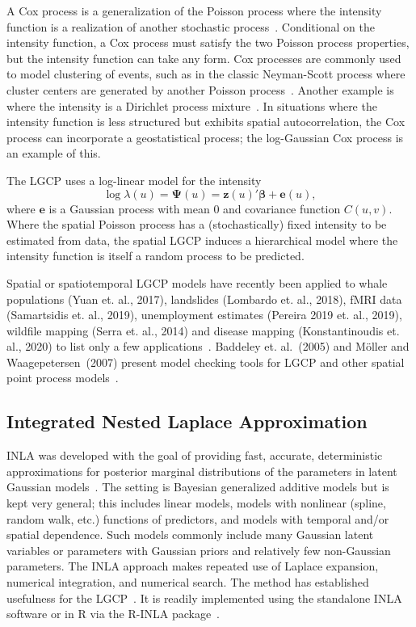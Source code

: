 \documentclass{interact}
\begin{document}
A Cox process is a generalization of the Poisson process where the intensity
function is a realization of another stochastic process~\cite{cox,digglepoint}.
Conditional on the intensity function, a Cox process must satisfy the two
Poisson process properties, but the intensity function can take any form. Cox
processes are commonly used to model clustering of events, such as in the
classic Neyman-Scott process where cluster centers are generated by another
Poisson process~\cite{neymanscott}. Another example is where the intensity is
a Dirichlet process mixture~\cite{taddy,flagg2020}. In situations where the intensity
function is less structured but exhibits spatial autocorrelation, the Cox
process can incorporate a geostatistical process; the log-Gaussian Cox process
is an example of this.

The LGCP uses a log-linear model for the intensity
\begin{equation}
\log\lambda(u) = \boldsymbol{\Psi}(u)
= \mathbf{z}(u)' \boldsymbol{\beta} + \mathbf{e}(u),
\end{equation}
where \(\mathbf{e}\) is a Gaussian process with mean 0 and covariance function
\(C(u, v)\). Where the spatial Poisson process has a (stochastically) 
fixed intensity to be
estimated from data, the spatial LGCP induces a hierarchical model where the
intensity function is itself a random process to be predicted.

Spatial or spatiotemporal LGCP models have recently been applied to whale
populations (Yuan et. al., 2017), landslides (Lombardo et. al., 2018), fMRI
data (Samartsidis et. al., 2019), unemployment estimates (Pereira 2019 et. al., 2019), wildfile mapping (Serra et. al., 2014) and disease mapping (Konstantinoudis et.
al., 2020) to list only a few
applications~\cite{yuanetal,lombardoetal,samartsidisetal,pereira2019,serra2014,konstantinoudisetal}.
Baddeley et. al.~(2005) and M\"{o}ller and Waagepetersen~(2007) present model
checking tools for LGCP and other spatial point process
models~\cite{baddeleyresiduals,moellerwaagepetersen}.


\subsection{Integrated Nested Laplace Approximation}
\label{inla}

INLA was developed with the goal of providing fast, accurate, deterministic
approximations for posterior marginal distributions of the parameters in
latent Gaussian models~\cite{rueetal}. The setting is Bayesian generalized
additive models but is kept very general; this includes linear models, models
with nonlinear (spline, random walk, etc.) functions of predictors, and models
with temporal and/or spatial dependence. Such models commonly include many
Gaussian latent variables or parameters with Gaussian priors and relatively
few non-Gaussian parameters. The INLA approach makes repeated use of Laplace
expansion, numerical integration, and numerical search. The method has
established usefulness for the LGCP~\cite{illianetal}. It is readily implemented
using the standalone INLA software or in R via the R-INLA
package~\cite{inlar}.
\end{document}
